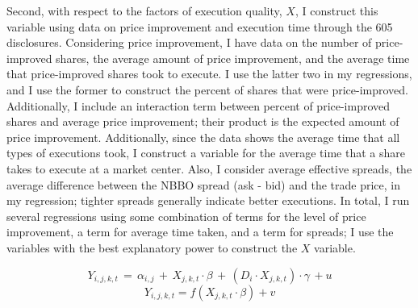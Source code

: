 \documentclass[12pt,a4paper]{article}
\begin{document}
	Second, with respect to the factors of execution quality, $X$, I construct this variable using data on price improvement and execution time through the 605 disclosures. Considering price improvement, I have data on the number of price-improved shares, the average amount of price improvement, and the average time that price-improved shares took to execute. I use the latter two in my regressions, and I use the former to construct the percent of shares that were price-improved. Additionally, I include an interaction term between percent of price-improved shares and average price improvement; their product is the expected amount of price improvement. Additionally, since the data shows the average time that all types of executions took, I construct a variable for the average time that a share takes to execute at a market center. Also, I consider average effective spreads, the average difference between the NBBO spread (ask - bid) and the trade price, in my regression; tighter spreads generally indicate better executions. In total, I run several regressions using some combination of terms for the level of price improvement, a term for average time taken, and a term for spreads; I use the variables with the best explanatory power to construct the $X$ variable. 
	
	\begin{equation}
	Y_{i, j, k,  t} \,=\, \alpha_{i,j} \,+\,  X_{j, k, t} \cdot \beta \,+\,  (D_i \cdot X_{j, k, t}) \cdot \gamma\, +  u
	\end{equation}	
	\begin{equation}
	Y_{i, j, k, t} = f(X_{j, k, t} \cdot \beta) +  v
	\end{equation}	
\end{document}
